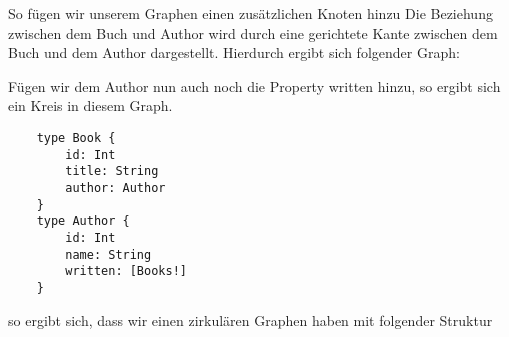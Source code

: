 So fügen wir unserem Graphen einen zusätzlichen Knoten hinzu
Die Beziehung zwischen dem Buch und Author wird durch eine gerichtete Kante zwischen dem Buch und dem Author dargestellt.
Hierdurch ergibt sich folgender Graph:

\begin{figure}
    \begin{center}
    \end{center}
    \label{fig:2types}
\end{figure}

Fügen wir dem Author nun auch noch die Property written hinzu, so ergibt sich ein Kreis in diesem Graph.

\begin{verbatim}
    type Book {
        id: Int
        title: String
        author: Author
    }
    type Author {
        id: Int
        name: String
        written: [Books!]
    }
\end{verbatim}

so ergibt sich, dass wir einen zirkulären Graphen haben mit folgender Struktur

